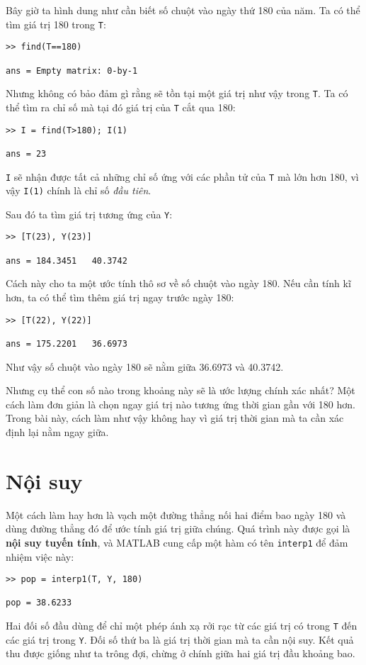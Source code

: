 \documentclass[12pt]{book}
\begin{document}
Bây giờ ta hình dung như cần biết số chuột vào ngày thứ 180 của năm. Ta có thể 
tìm giá trị 180 trong  {\tt T}:

\begin{verbatim}
>> find(T==180)

ans = Empty matrix: 0-by-1
\end{verbatim}
%
Nhưng không có bảo đảm gì rằng sẽ tồn tại một giá trị như vậy trong {\tt T}.  
Ta có thể tìm ra chỉ số mà tại đó giá trị của {\tt T} cắt qua  180:

\begin{verbatim}
>> I = find(T>180); I(1)

ans = 23
\end{verbatim}
%
{\tt I} sẽ nhận được tất cả những  chỉ số ứng với các phần tử của  {\tt T} mà lớn 
hơn  180, vì vậy  {\tt I(1)} chính là chỉ số  {\em đầu tiên}.

Sau đó ta tìm giá trị tương ứng của  {\tt Y}:

\begin{verbatim}
>> [T(23), Y(23)]

ans = 184.3451   40.3742
\end{verbatim}
%
Cách này cho ta một ước tính thô sơ về số chuột vào ngày 180. Nếu cần 
tính kĩ hơn, ta có thể tìm thêm giá trị ngay trước ngày 180:

\begin{verbatim}
>> [T(22), Y(22)]

ans = 175.2201   36.6973
\end{verbatim}
%
Như vậy số chuột vào ngày 180 sẽ nằm giữa  36.6973 và  40.3742.

Nhưng cụ thể con số nào trong khoảng này sẽ là ước lượng chính xác nhất?
Một cách làm đơn giản là chọn ngay giá trị nào tương ứng thời gian gần với 
180 hơn. Trong bài này, cách làm như vậy không hay vì giá trị thời gian mà 
ta cần xác định lại nằm ngay giữa.


\section{Nội suy}

Một cách làm hay hơn là vạch một đường thẳng nối hai điểm bao ngày 180
và dùng đường thẳng đó để ước tính giá trị giữa chúng. Quá trình này được 
gọi là {\bf nội suy tuyến tính}, và MATLAB cung cấp một hàm có tên 
{\tt interp1} để đảm nhiệm việc này:

\begin{verbatim}
>> pop = interp1(T, Y, 180)

pop = 38.6233
\end{verbatim}
%
Hai đối số đầu dùng để chỉ một phép ánh xạ rởi rạc từ các giá trị có 
trong {\tt T} đến các giá trị trong  {\tt Y}.  Đối số thứ ba là giá trị thời gian 
mà ta cần nội suy. Kết quả thu được giống như ta trông đợi, chừng ở chính  giữa 
hai giá trị đầu khoảng bao. 
\end{document}
